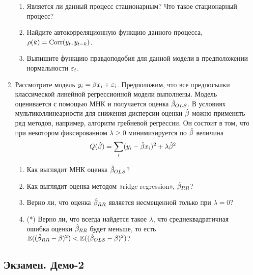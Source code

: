 \documentclass[12pt, a4paper]{article}
\begin{document}
\begin{enumerate}
\begin{enumerate}
\item Является ли данный процесс стационарным? Что такое стационарный процесс?
\item Найдите автокорреляционную функцию данного процесса, $\rho(k)=\operatorname{Corr}(y_t,y_{t-k})$.
\item Выпишите функцию правдоподобия для данной модели в предположении нормальности $\varepsilon_t$.
\end{enumerate}



\item Рассмотрите модель $y_i=\beta x_i+\varepsilon_i$. Предположим, что все предпосылки классической линейной регрессионной модели выполнены. Модель оценивается с помощью МНК и получается оценка $\hat{\beta}_{OLS}$.
В условиях мультиколлинеарности для снижения дисперсии оценки $\hat{\beta}$ можно применять ряд методов, например, алгоритм гребневой регрессии. Он состоит в том, что при некотором фиксированном $\lambda\geq 0$ минимизируется по $\hat{\beta}$ величина
\[
Q(\hat{\beta})=\sum_i (y_i-\hat{\beta} x_i)^2+\lambda \hat{\beta}^2
\]
\begin{enumerate}
\item Как выглядит МНК оценка $\hat{\beta}_{OLS}$?
\item Как выглядит оценка методом «ridge regression», $\hat{\beta}_{RR}$?
\item Верно ли, что оценка $\hat{\beta}_{RR}$ является несмещенной только при $\lambda=0$?
\item (*) Верно ли, что всегда найдется такое $\lambda$, что среднеквадратичная ошибка оценки $\hat{\beta}_{RR}$ будет меньше,
то есть $\mathbb{E}((\hat{\beta}_{RR}-\beta)^2)<\mathbb{E}((\hat{\beta}_{OLS}-\beta)^2)$?
\end{enumerate}


\end{enumerate}


\subsection{Экзамен. Демо-2}
\end{document}
